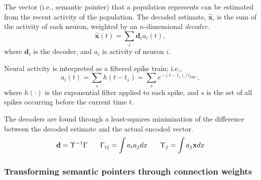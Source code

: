\documentclass[10pt,letterpaper]{article}
\begin{document}

The vector (i.e., semantic pointer)
that a population represents
can be estimated from the recent activity
of the population.
The decoded estimate, $\mathbf{\hat{x}}$,
is the sum of the activity of each neuron,
weighted by an $n$-dimensional \textit{decoder}.
\begin{equation}
  \mathbf{\hat{x}}(t) = \sum_i \mathbf{d}_i a_i(t),
\end{equation}
where $\mathbf{d}_i$ is the decoder,
and $a_i$ is activity of neuron $i$.

Neural activity is interpreted as a
filtered spike train; i.e.,
\begin{equation} \label{eq:filter-spikes}
  a_i(t) = \sum_s h(t - t_s) = \sum_s e^{-(t - t_s) / \tau_{PSC}},
\end{equation}
where $h(\cdot)$ is the exponential filter
applied to each spike,
and $s$ is the set of all spikes occurring
before the current time $t$.


The decoders are found through a least-squares minimization
of the difference between the decoded estimate
and the actual encoded vector.
\begin{equation}
  \mathbf{d} = \Upsilon^{-1} \Gamma \hspace{1.8em}
  \Gamma_{ij} = \int a_i a_j dx \hspace{1.8em}
  \Upsilon_j = \int a_j \mathbf{x} dx
\end{equation}

\subsubsection{Transforming semantic pointers through connection weights}
\end{document}
